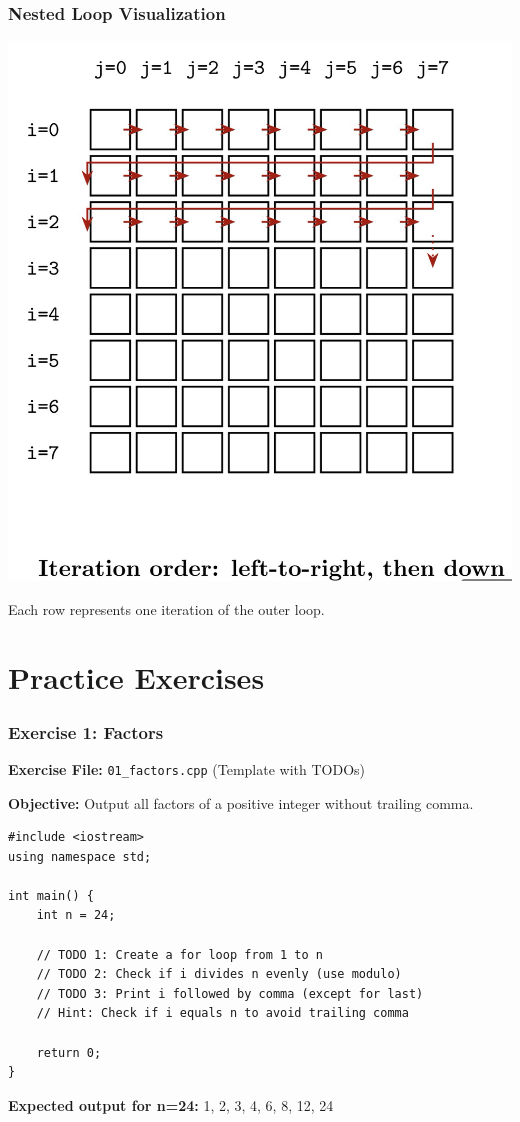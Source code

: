 \documentclass{beamer}
\begin{document}
\begin{frame}
\frametitle{Nested Loop Visualization}
\includegraphics[width=\textwidth]{../images/Nested-Loop.png}

Each row represents one iteration of the outer loop.
\end{frame}

\section{Practice Exercises}

\begin{frame}[fragile]
\frametitle{Exercise 1: Factors}
\textbf{Exercise File:} \texttt{01\_factors.cpp} (Template with TODOs)

\textbf{Objective:} Output all factors of a positive integer without trailing comma.\pause

\begin{verbatim}
#include <iostream>
using namespace std;

int main() {
    int n = 24;
    
    // TODO 1: Create a for loop from 1 to n
    // TODO 2: Check if i divides n evenly (use modulo)
    // TODO 3: Print i followed by comma (except for last)
    // Hint: Check if i equals n to avoid trailing comma
    
    return 0;
}
\end{verbatim}

\textbf{Expected output for n=24:} 1, 2, 3, 4, 6, 8, 12, 24
\end{frame}
\end{document}
